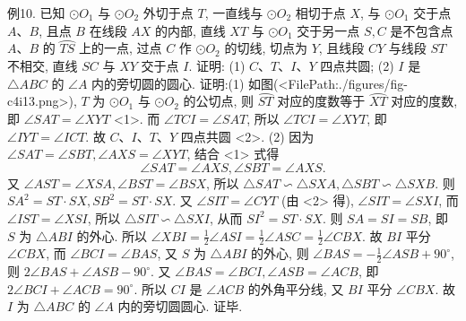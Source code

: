 例10. 已知 $\odot O_1$ 与 $\odot O_2$ 外切于点 $T$, 一直线与 $\odot O_2$ 相切于点 $X$, 与 $\odot O_1$ 交于点 $A 、 B$, 且点 $B$ 在线段 $A X$ 的内部, 直线 $X T$ 与 $\odot O_1$ 交于另一点 $S, C$ 是不包含点 $A 、 B$ 的 $\overparen{T S}$ 上的一点, 过点 $C$ 作 $\odot O_2$ 的切线, 切点为 $Y$, 且线段 $C Y$ 与线段 $S T$ 不相交, 直线 $S C$ 与 $X Y$ 交于点 $I$. 证明: (1) $C 、 T 、 I 、 Y$ 四点共圆; (2) $I$ 是 $\triangle A B C$ 的 $\angle A$ 内的旁切圆的圆心.
证明:(1) 如图(<FilePath:./figures/fig-c4i13.png>), $T$ 为 $\odot O_1$ 与 $\odot O_2$ 的公切点, 则 $\overparen{S T}$ 对应的度数等于 $\overparen{X T}$ 对应的度数, 即 $\angle S A T=\angle X Y T$ <1>.
而 $\angle T C I=\angle S A T$, 所以 $\angle T C I=\angle X Y T$, 即 $\angle I Y T=\angle I C T$.
故 $C 、 I 、 T 、 Y$ 四点共圆 <2>. 
(2) 因为 $\angle S A T=\angle S B T, \angle A X S=\angle X Y T$, 结合 <1> 式得
$$
\angle S A T=\angle A X S, \angle S B T=\angle A X S .
$$
又 $\angle A S T=\angle X S A, \angle B S T=\angle B S X$, 所以 $\triangle S A T \backsim \triangle S X A, \triangle S B T \backsim \triangle S X B$.
则 $S A^2=S T \cdot S X, S B^2=S T \cdot S X$.
又 $\angle S I T=\angle C Y T$ (由 <2> 得), $\angle S I T=\angle S X I$, 而 $\angle I S T=\angle X S I$, 所以 $\triangle S I T \backsim \triangle S X I$, 从而 $S I^2=S T \cdot S X$.
则 $S A=S I=S B$, 即 $S$ 为 $\triangle A B I$ 的外心.
所以 $\angle X B I=\frac{1}{2} \angle A S I=\frac{1}{2} \angle A S C=\frac{1}{2} \angle C B X$.
故 $B I$ 平分 $\angle C B X$, 而 $\angle B C I=\angle B A S$, 又 $S$ 为 $\triangle A B I$ 的外心, 则 $\angle B A S=-\frac{1}{2} \angle A S B+90^{\circ}$, 则 $2 \angle B A S+\angle A S B-90^{\circ}$.
又 $\angle B A S=\angle B C I, \angle A S B=\angle A C B$, 即 $2 \angle B C I+\angle A C B=90^{\circ}$.
所以 $C I$ 是 $\angle A C B$ 的外角平分线, 又 $B I$ 平分 $\angle C B X$.
故 $I$ 为 $\triangle A B C$ 的 $\angle A$ 内的旁切圆圆心.
证毕.


